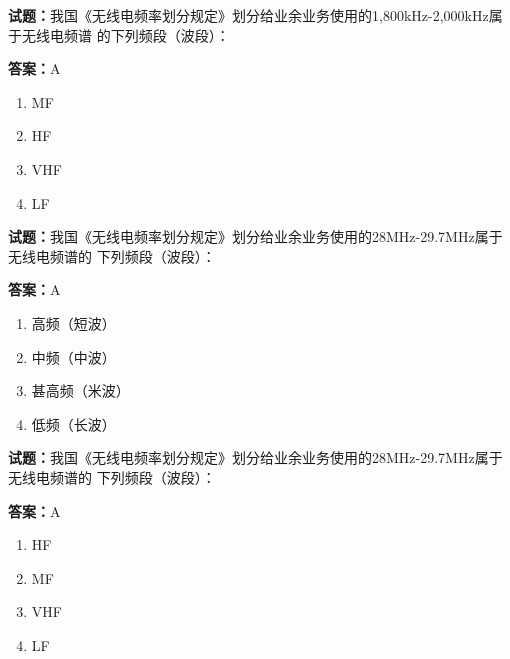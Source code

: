 \documentclass{ctexbook}
\begin{document}




\vspace{1em}

\textbf{试题：}我国《无线电频率划分规定》划分给业余业务使用的1,800kHz-2,000kHz属于无线电频谱
的下列频段（波段）： 

\textbf{答案：}A 

\begin{enumerate}[leftmargin=3em]
  \item MF 

  \item HF 

  \item VHF 

  \item LF 

\end{enumerate}






\vspace{1em}

\textbf{试题：}我国《无线电频率划分规定》划分给业余业务使用的28MHz-29.7MHz属于无线电频谱的
下列频段（波段）： 

\textbf{答案：}A 

\begin{enumerate}[leftmargin=3em]
  \item 高频（短波） 

  \item 中频（中波） 

  \item 甚高频（米波） 

  \item 低频（长波） 

\end{enumerate}





\vspace{1em}

\textbf{试题：}我国《无线电频率划分规定》划分给业余业务使用的28MHz-29.7MHz属于无线电频谱的
下列频段（波段）： 

\textbf{答案：}A 

\begin{enumerate}[leftmargin=3em]
  \item HF 

  \item MF 

  \item VHF 

  \item LF 

\end{enumerate}
\end{document}
